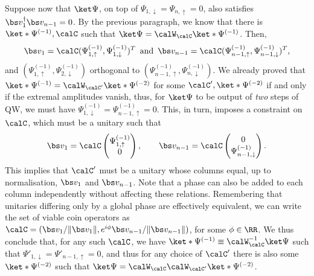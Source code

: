 Suppose now that $\ket\Psi$, on top of $\Psi_{1,\downarrow}=\Psi_{n,\uparrow}=0$, also satisfies $\bs v_1^\dagger \bs v_{n-1}=0$.
By the previous paragraph, we know that there is $\ket*{\Psi^{(-1)}},\calC$ such that $\ket\Psi=\calW_\calC\ket*{\Psi^{(-1)}}$. Then,
\begin{equation}
    \bs v_1=\calC(\Psi^{(-1)}_{1,\uparrow},\Psi^{(-1)}_{1,\downarrow})^T
    \,\text{ and }\,
    \bs v_{n-1}=\calC(\Psi^{(-1)}_{n-1,\uparrow},\Psi^{(-1)}_{n-1,\downarrow})^T,
\end{equation}
and $(\Psi^{(-1)}_{1,\uparrow},\Psi^{(-1)}_{2,\downarrow})$ orthogonal to
$(\Psi^{(-1)}_{n-1,\uparrow},\Psi^{(-1)}_{n,\downarrow})$.
We already proved that $\ket*{\Psi^{(-1)}}=\calW_{\calC'}\ket*{\Psi^{(-2)}}$ for some $\calC',\ket*{\Psi^{(-2)}}$ if and only if the extremal amplitudes vanish, thus, for $\ket\Psi$ to be output of \emph{two} steps of QW, we must have
$\Psi^{(-1)}_{1,\downarrow}=\Psi^{(-1)}_{n-1,\uparrow}=0$.
This, in turn, imposes a constraint on $\calC$, which must be a unitary such that
\begin{equation}
    \bs v_1 = \calC \begin{pmatrix}
        \Psi^{(-1)}_{1,\uparrow} \\ 0
    \end{pmatrix}, \qquad
    \bs v_{n-1} = \calC \begin{pmatrix}
        0 \\ \Psi^{(-1)}_{n-1,\downarrow}
    \end{pmatrix}.
\end{equation}
This implies that $\calC'$ must be a unitary whose columns equal, up to normalisation, $\bs v_1$ and $\bs v_{n-1}$. Note that a phase can also be added to each column independently without affecting these relations. Remembering that unitaries differing only by a global phase are effectively equivalent, we can write the set of viable coin operators as
$\calC = (\bs v_1/\|\bs v_1\|, e^{i\phi}\bs v_{n-1}/\|\bs v_{n-1}\|)$,
for some $\phi\in\RR$.
We thus conclude that, for any such $\calC$, we have $\ket*{\Psi^{(-1)}}\equiv\calW_{\calC}^{-1}\ket\Psi$ such that $\Psi'_{1,\downarrow}=\Psi'_{n-1,\uparrow}=0$, and thus for any choice of $\calC'$ there is also some $\ket*{\Psi^{(-2)}}$ such that $\ket\Psi=\calW_\calC\calW_{\calC'}\ket*{\Psi^{(-2)}}$.

